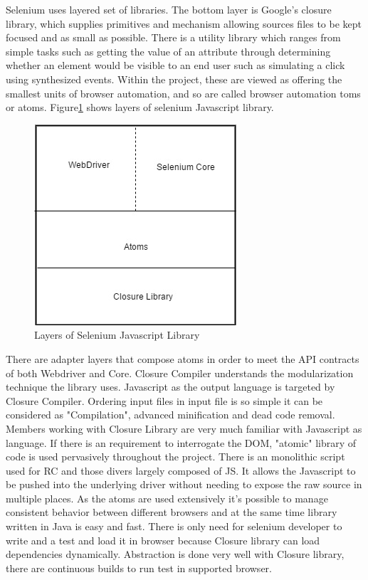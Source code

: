 \documentclass[article,type=msc,colorback,accentcolor=tud9c,twoside,11pt]{tudthesis}
\begin{document}
Selenium uses layered set of libraries. The bottom layer is Google's closure library, which supplies primitives and mechanism allowing sources files to be kept focused and as small as possible. There is a utility library which ranges from simple tasks such as getting the value of an attribute through determining whether an element would be visible to an end user such as simulating a click using synthesized events. Within the project, these are viewed as offering the smallest units of browser automation, and so are called browser automation toms or atoms. 
 Figure\ref{fig:LayersofSeleniumJSLibrary} shows layers of selenium Javascript library.
\begin{figure}[h]
	\centering
	\includegraphics[scale=0.6]{LayersofSeleniumJSLibrary}
	\caption{Layers of Selenium Javascript Library}
	\label{fig:LayersofSeleniumJSLibrary}
\end{figure}
There are adapter layers that compose atoms in order to meet the API contracts of both Webdriver and Core. Closure Compiler understands the modularization technique the library uses. Javascript as the output language is targeted by Closure Compiler. Ordering input files in input file is so simple it can be considered as "Compilation", advanced minification and dead code removal. Members working with Closure Library are very much familiar with Javascript as language. If there is an requirement to interrogate the DOM, "atomic" library of code is used pervasively throughout the project. There is an monolithic script used for RC and those divers largely composed of JS. It allows the Javascript to be pushed into the underlying driver without needing to expose the raw source in multiple places. As the atoms are used extensively it's possible to manage consistent behavior between different browsers and at the same time library written in Java is easy and fast. There is only need for selenium developer to write and a test and load it in browser because Closure library can load dependencies dynamically. Abstraction is done very well with Closure library, there are continuous builds to run test in supported browser.
\end{document}
